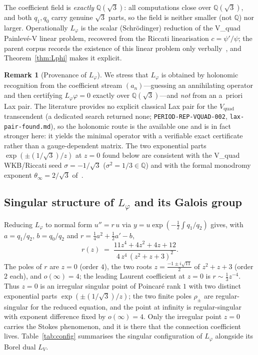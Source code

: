 \documentclass[11pt,reqno]{amsart}
\theoremstyle{plain}
\theoremstyle{definition}
\newtheorem{remark}[theorem]{Remark}
\newcommand{\Vquad}{V_{\mathrm{quad}}}
\newcommand{\Lphi}{L_{\varphi}}
\newcommand{\LV}{L_{V}}
\newcommand{\Qsqrt}{\mathbb{Q}(\sqrt3)}
\begin{document}
The coefficient field is \emph{exactly} $\Qsqrt$: all computations close over $\Qsqrt$, and both
$q_1,q_0$ carry genuine $\sqrt3$ parts, so the field is neither smaller (not $\mathbb{Q}$) nor
larger. Operationally $\Lphi$ is the scalar (Schr\"odinger) reduction of the V\_quad Painlev\'e-V
linear problem, recovered from the Riccati linearisation $c=\psi'/\psi$; the parent corpus
records the existence of this linear problem only verbally~\cite{Vquad}, and Theorem~\ref{thm:Lphi}
makes it explicit.

\begin{remark}[Provenance of $\Lphi$]\label{rmk:provenance}
We stress that $\Lphi$ is obtained by holonomic recognition from the coefficient stream
$(a_n)$---guessing an annihilating operator and then certifying $\Lphi\varphi=0$ exactly over
$\Qsqrt$---and \emph{not} from an a~priori Lax pair. The literature provides no explicit classical
Lax pair for the $\Vquad$ transcendent (a dedicated search returned none;
\texttt{PERIOD-REP-VQUAD-002}, \texttt{lax-pair-found.md}), so the holonomic route is the available
one and is in fact stronger here: it yields the minimal operator with a verifiable exact
certificate rather than a gauge-dependent matrix. The two exponential parts
$\exp(\pm(1/\sqrt3)/z)$ at $z=0$ found below are consistent with the V\_quad WKB/Riccati seed
$\sigma=-1/\sqrt3$ ($\sigma^2=1/3\in\mathbb{Q}$) and with the formal monodromy exponent
$\theta_\infty=2/\sqrt3$ of~\cite{Vquad}.
\end{remark}

\subsection{Singular structure of \texorpdfstring{$\Lphi$}{Lphi} and its Galois group}
Reducing $\Lphi$ to normal form $u''=r\,u$ via $y=u\exp(-\tfrac12\int q_1/q_2)$ gives, with
$a=q_1/q_2$, $b=q_0/q_2$ and $r=\tfrac14a^2+\tfrac12a'-b$,
\begin{equation}\label{eq:r}
  r(z)\;=\;\frac{11z^4+4z^2+4z+12}{\,4\,z^4\,(z^2+z+3)^2\,}.
\end{equation}
The poles of $r$ are $z=0$ (order $4$), the two roots $z=\tfrac{-1\pm i\sqrt{11}}2$ of $z^2+z+3$
(order $2$ each), and $o(\infty)=4$; the leading Laurent coefficient at $z=0$ is
$r\sim\tfrac13 z^{-4}$. Thus $z=0$ is an irregular singular point of Poincar\'e rank $1$ with two
distinct exponential parts $\exp(\pm(1/\sqrt3)/z)$; the two finite poles $\rho_\pm$ are
regular-singular for the reduced equation, and the point at infinity is regular-singular with
exponent difference fixed by $o(\infty)=4$. Only the irregular point $z=0$ carries the Stokes
phenomenon, and it is there that the connection coefficient lives. Table~\ref{tab:config}
summarises the singular configuration of $\Lphi$ alongside its Borel dual $\LV$.
\end{document}
